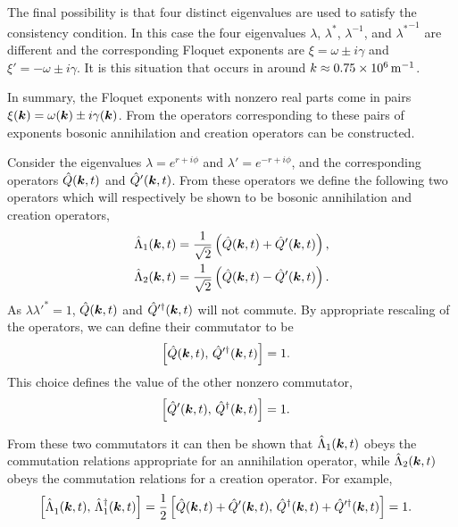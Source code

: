The final possibility is that four distinct eigenvalues are used to satisfy the consistency condition. In this case the four eigenvalues $\lambda$, $\lambda^*$, $\lambda^{-1}$, and ${\lambda^*}^{-1}$ are different and the corresponding Floquet exponents are $\xi = \omega \pm i\gamma$ and $\xi' = -\omega \pm i\gamma$. It is this situation that occurs in  around $k \approx \unit[0.75 \times 10^6]{m}^{-1}$.

In summary, the Floquet exponents with nonzero real parts come in pairs $\xi(\bm{k}) = \omega(\bm{k}) \pm i\gamma(\bm{k})$. From the operators corresponding to these pairs of exponents bosonic annihilation and creation operators can be constructed.

Consider the eigenvalues $\displaystyle \lambda = e^{r + i \phi}$ and $\displaystyle \lambda' = e^{-r + i\phi}$, and the corresponding operators $\hat{Q}(\bm{k}, t)$ and $\hat{Q}'(\bm{k}, t)$. From these operators we define the following two operators which will respectively be shown to be bosonic annihilation and creation operators,
\begin{align}
    \hat{\Lambda}_1(\bm{k}, t) &= \frac{1}{\sqrt{2}} \left( \hat{Q}(\bm{k}, t) + \hat{Q}'(\bm{k}, t)\right),\\
    \hat{\Lambda}_2(\bm{k}, t) &= \frac{1}{\sqrt{2}} \left( \hat{Q}(\bm{k}, t) - \hat{Q}'(\bm{k}, t)\right).
\end{align}
As $\lambda \lambda'^* = 1$, $\hat{Q}(\bm{k}, t)$ and $\hat{Q}'^\dagger(\bm{k}, t)$ will not commute. By appropriate rescaling of the operators, we can define their commutator to be
\begin{align}
    \left[ \hat{Q}(\bm{k}, t),\, \hat{Q}'^\dagger(\bm{k}, t) \right] &= 1.
\end{align}
This choice defines the value of the other nonzero commutator,
\begin{align}
    \left[ \hat{Q}'(\bm{k}, t),\, \hat{Q}^\dagger(\bm{k}, t) \right] &= 1.
\end{align}

From these two commutators it can then be shown that $\hat{\Lambda}_1(\bm{k}, t)$ obeys the commutation relations appropriate for an annihilation operator, while $\hat{\Lambda}_2(\bm{k}, t)$ obeys the commutation relations for a creation operator. For example,
\begin{align}
    \left[\hat{\Lambda}_1^{\phantom{\dagger}}(\bm{k}, t),\, \hat{\Lambda}_1^\dagger(\bm{k}, t) \right] &= \frac{1}{2} \left[ \hat{Q}(\bm{k}, t) + \hat{Q}'(\bm{k}, t),\, \hat{Q}^\dagger(\bm{k}, t) + \hat{Q}'^\dagger(\bm{k}, t)\right] = 1.
\end{align}

